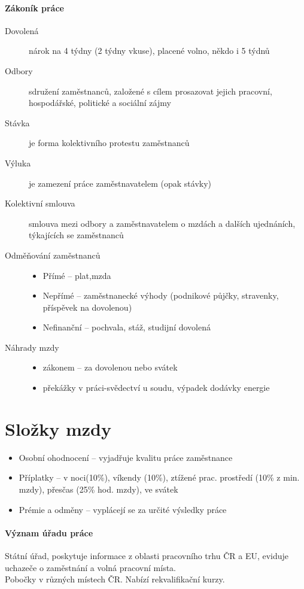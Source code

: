 \documentclass[11pt,a4paper,twoside]{book}
\begin{document}
	\paragraph*{Zákoník práce}
	\begin{description}
		\item[Dovolená] nárok na 4 týdny (2 týdny vkuse), placené volno, někdo i 5 týdnů
		\item[Odbory] sdružení zaměstnanců, založené s cílem prosazovat jejich pracovní, hospodářské, politické a sociální zájmy
		\item[Stávka] je forma kolektivního protestu zaměstnanců
		\item[Výluka] je zamezení práce zaměstnavatelem (opak stávky)
		\item[Kolektivní smlouva] smlouva mezi odbory a zaměstnavatelem o mzdách a dalších ujednáních, týkajících se zaměstnanců
		\item[Odměňování zaměstnanců]
			\begin{itemize}
				\item Přímé -- plat,mzda
				\item Nepřímé -- zaměstnanecké výhody (podnikové půjčky, stravenky, příspěvek na dovolenou)
				\item Nefinanční -- pochvala, stáž, studijní dovolená				
			\end{itemize}
		\item[Náhrady mzdy]
			\begin{itemize}
				\item zákonem -- za dovolenou nebo svátek
				\item překážky v práci-svědectví u soudu, výpadek dodávky energie
			\end{itemize}
	\end{description}

	\section*{Složky mzdy}
	\begin{itemize}			
		\item Osobní ohodnocení -- vyjadřuje kvalitu práce zaměstnance
		\item Příplatky -- v noci(10\%), víkendy (10\%), ztížené prac. prostředí (10\% z min. mzdy), přesčas (25\% hod. mzdy), ve svátek
		\item Prémie a odměny -- vyplácejí se za určité výsledky práce
	\end{itemize}

	\paragraph*{Význam úřadu práce}
	Státní úřad, poskytuje informace z oblasti pracovního trhu ČR a EU, eviduje uchazeče o zaměstnání a volná pracovní místa. \\
	Pobočky v různých místech ČR. Nabízí rekvalifikační kurzy.
\end{document}
